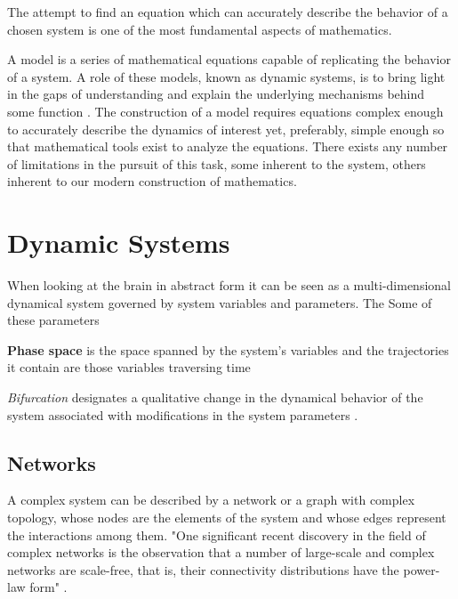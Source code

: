 \documentclass[../../Orator.tex]{subfiles}
\begin{document}
The attempt to find an equation which can accurately describe the behavior of a chosen system is one of the most fundamental aspects of mathematics.

A model is a series of mathematical equations capable of replicating the behavior of a system. A role of these models, known as dynamic systems, is to bring light in the gaps of understanding and explain the underlying mechanisms behind some function \citelater. 
The construction of a model requires equations complex enough to accurately describe the dynamics of interest yet, preferably, simple enough so that mathematical tools exist to analyze the equations\footnotemark. 
There exists any number of limitations in the pursuit of this task, some inherent to the system, others inherent to our modern construction of mathematics.

\section{Dynamic Systems}

When looking at the brain in abstract form it can be seen as a multi-dimensional dynamical system governed by system variables and parameters.
The 
Some of these parameters

\textbf{Phase space} is the space spanned by the system's variables and the trajectories it contain are those variables traversing time

\textit{Bifurcation} designates a qualitative change in the dynamical behavior of the system associated with modifications in the system parameters \cite{STEFANESCU2012748}.


\subsection*{Networks}
A complex system can be described by a network or a graph with complex topology, whose nodes are the elements of the system and whose edges represent the interactions among them. "One significant recent discovery in the field of complex networks is the observation that a number of
large-scale and complex networks are scale-free, that is, their connectivity distributions have the
power-law form" \cite{wang2002synchronization}.
\end{document}
